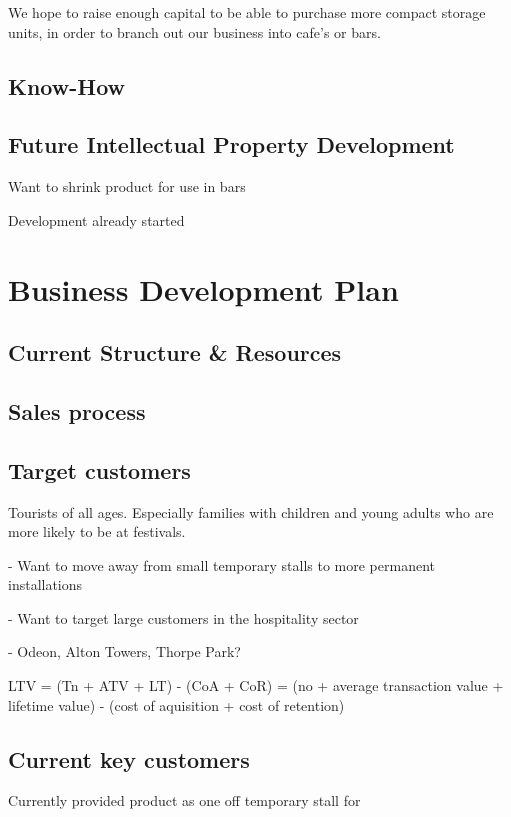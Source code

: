 \documentclass{article}
\begin{document}
We hope to raise enough capital to be able to purchase more compact storage units, in order to branch out our business into cafe's or bars.

  \subsection{Know-How}

  \subsection{Future Intellectual Property Development}

  Want to shrink product for use in bars

  Development already started

\section{Business Development Plan}

  \subsection{Current Structure \& Resources}

  \subsection{Sales process}

  \subsection{Target customers}
Tourists of all ages. Especially families with children and young adults
who are more likely to be at festivals.

 - Want to move away from small temporary stalls to more permanent
installations

 - Want to target large customers in the hospitality sector

 - Odeon, Alton Towers, Thorpe Park?

   LTV = (Tn + ATV + LT) - (CoA + CoR)
       = (no + average transaction value + lifetime value) - (cost of aquisition + cost of retention) 

  \subsection{Current key customers}

  Currently provided product as one off temporary stall for 
\end{document}
